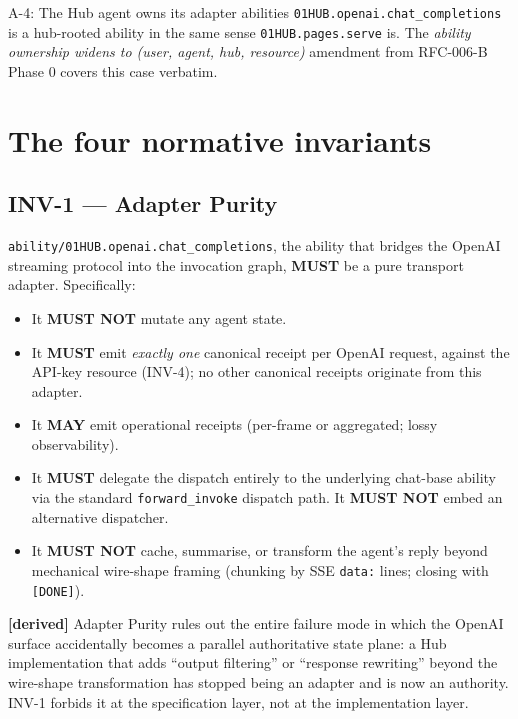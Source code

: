 \documentclass[11pt,a4paper]{article}
\newcommand{\derived}{\textcolor{derivedcolor}{\textbf{[derived]}}\xspace}
\theoremstyle{definition}
\begin{document}
\begin{assumptionbox}{A-4: The Hub agent owns its adapter abilities}
\texttt{01HUB.openai.chat\_completions} is a hub-rooted ability
in the same sense \texttt{01HUB.pages.serve} is. The
\emph{ability ownership widens to (user, agent, hub, resource)}
amendment from RFC-006-B Phase 0 covers this case verbatim.
\end{assumptionbox}

\section{The four normative invariants}
\label{sec:invariants}

\subsection{INV-1 --- Adapter Purity}

\begin{invariant}
\texttt{ability/01HUB.openai.chat\_completions}, the ability
that bridges the OpenAI streaming protocol into the invocation
graph, \textbf{MUST} be a pure transport adapter. Specifically:
\begin{itemize}[leftmargin=2em,itemsep=0.1em]
    \item It \textbf{MUST NOT} mutate any agent state.
    \item It \textbf{MUST} emit \emph{exactly one} canonical
    receipt per OpenAI request, against the API-key resource
    (INV-4); no other canonical receipts originate from this
    adapter.
    \item It \textbf{MAY} emit operational receipts (per-frame
    or aggregated; lossy observability).
    \item It \textbf{MUST} delegate the dispatch entirely to
    the underlying chat-base ability via the standard
    \texttt{forward\_invoke} dispatch path. It \textbf{MUST NOT}
    embed an alternative dispatcher.
    \item It \textbf{MUST NOT} cache, summarise, or transform
    the agent's reply beyond mechanical wire-shape framing
    (chunking by SSE \texttt{data:} lines; closing with
    \texttt{[DONE]}).
\end{itemize}
\end{invariant}

\derived{} Adapter Purity rules out the entire failure mode in
which the OpenAI surface accidentally becomes a parallel
authoritative state plane: a Hub implementation that adds
``output filtering'' or ``response rewriting'' beyond the
wire-shape transformation has stopped being an adapter and is
now an authority. INV-1 forbids it at the specification layer,
not at the implementation layer.
\end{document}
